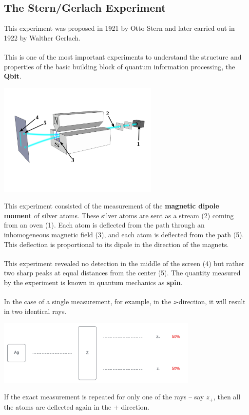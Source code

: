 \documentclass{article}
\begin{document}
\subsection{The Stern/Gerlach Experiment}
This experiment was proposed in 1921 by Otto Stern and later carried out in 1922 by Walther Gerlach. \\ \\
This is one of the most important experiments to understand the structure and properties of the basic building block of quantum information processing, the \textbf{Qbit}.

\begin{center}
	\includegraphics[width=8cm]{assets/stern_gerlach.png}
\end{center}
This experiment consisted of the measurement of the \textbf{magnetic dipole moment} of silver atoms. These silver atoms are sent as a stream (2) coming from an oven (1). Each atom is deflected from the path through an inhomogeneous magnetic field (3), and each atom is deflected from the path (5). This deflection is proportional to its dipole in the direction of the magnets. \\ \\
This experiment revealed no detection in the middle of the screen (4) but rather two sharp peaks at equal distances from the center (5). The quantity measured by the experiment is known in quantum mechanics as \textbf{spin}. \\ \\
In the case of a single measurement, for example, in the $z$-direction, it will result in two identical rays.

\begin{center}
	\includegraphics[width=10cm]{assets/one_z_measurement.pdf}
\end{center}
If the exact measurement is repeated for only one of the rays -- say $z_+$, then all the atoms are deflected again in the $+$ direction.
\end{document}
